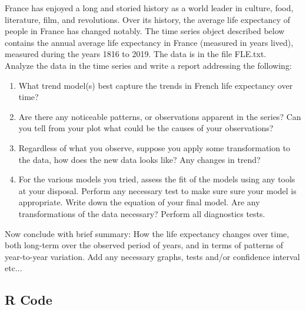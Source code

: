 France has enjoyed a long and storied history as a world leader in culture, food,
literature, film, and revolutions. Over its history, the average life expectancy of people in France
has changed notably. The time series object described below contains the annual average life
expectancy in France (measured in years lived), measured during the years 1816 to 2019. The
data is in the file FLE.txt. \\

\noindent Analyze the data in the time series and write a report addressing the following:

\begin{enumerate}[label=(\alph*)]
    \item What trend model(s) best capture the trends in French life expectancy over time?
    \item Are there any noticeable patterns, or observations apparent in the series? Can you tell from
your plot what could be the causes of your observations?
    \item Regardless of what you observe, suppose you apply some transformation to the data, how
does the new data looks like? Any changes in trend?
    \item For the various models you tried, assess the fit of the models using any tools at your disposal. Perform any necessary test to make sure sure your model is appropriate. Write down the equation of your final model. Are any transformations of the data necessary? Perform all diagnostics tests.
\end{enumerate}

\noindent Now conclude with brief summary: How the life expectancy changes over time, both long-term
over the observed period of years, and in terms of patterns of year-to-year variation. Add any
necessary graphs, tests and/or confidence interval etc...

\subsection{R Code}

